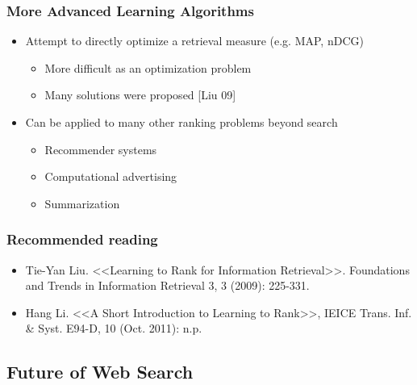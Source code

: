 \subsubsection{More Advanced Learning Algorithms}
\begin{itemize}
\item Attempt to directly optimize a retrieval measure (e.g. MAP, nDCG)
\begin{itemize}
\item More difficult as an optimization problem 
\item Many solutions were proposed [Liu 09]
\end{itemize}

\item Can be applied to many other ranking problems beyond search
\begin{itemize}
\item Recommender systems
\item Computational advertising 
\item Summarization
\end{itemize}
\end{itemize}


\subsubsection{Recommended reading}
\begin{itemize}
\item Tie-Yan Liu. <<Learning to Rank for Information Retrieval>>. Foundations and Trends in Information Retrieval 3, 3 (2009): 225-331.
\item Hang Li. <<A Short Introduction to Learning to Rank>>, IEICE Trans. Inf. \& Syst. E94-D, 10 (Oct. 2011): n.p.
\end{itemize}


\subsection{Future of Web Search}

